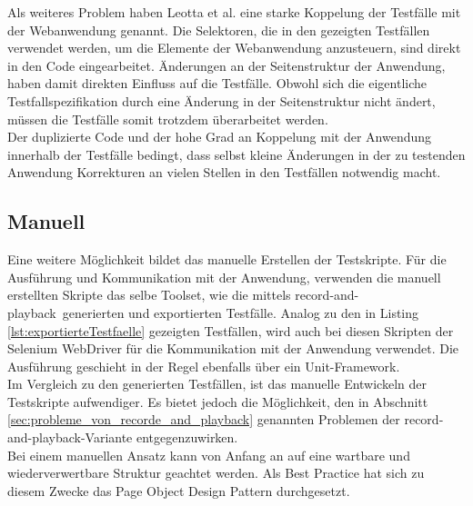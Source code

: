 Als weiteres Problem haben Leotta et al. \cite{leotta_repairing_2013} eine starke Koppelung der Testfälle mit der Webanwendung genannt. Die Selektoren, die in den gezeigten Testfällen verwendet werden, um die Elemente der Webanwendung anzusteuern, sind direkt in den Code eingearbeitet. Änderungen an der Seitenstruktur der Anwendung, haben damit direkten Einfluss auf die Testfälle.
Obwohl sich die eigentliche Testfallspezifikation durch eine Änderung in der Seitenstruktur nicht ändert, müssen die Testfälle somit trotzdem überarbeitet werden.\\
Der duplizierte Code und der hohe Grad an Koppelung mit der Anwendung innerhalb der Testfälle bedingt, dass selbst kleine Änderungen in der zu testenden Anwendung Korrekturen an vielen Stellen in den Testfällen notwendig macht.

\subsection{Manuell}
\label{sec:manuell}
Eine weitere Möglichkeit bildet das manuelle Erstellen der Testskripte. Für die Ausführung und Kommunikation mit der Anwendung, verwenden die manuell erstellten Skripte das selbe Toolset, wie die mittels \grq record-and-playback\grq\ generierten und exportierten Testfälle. Analog zu den in Listing \ref{lst:exportierteTestfaelle} gezeigten Testfällen, wird auch bei diesen Skripten der Selenium WebDriver für die Kommunikation mit der Anwendung verwendet. Die Ausführung geschieht in der Regel ebenfalls über ein Unit-Framework.\\
Im Vergleich zu den generierten Testfällen, ist das manuelle Entwickeln der Testskripte aufwendiger.
Es bietet jedoch die Möglichkeit, den in Abschnitt \ref{sec:probleme_von_recorde_and_playback} genannten Problemen der \grq record-and-playback\grq -Variante entgegenzuwirken.\\
Bei einem manuellen Ansatz kann von Anfang an auf eine wartbare und wiederverwertbare Struktur geachtet werden.
Als Best Practice hat sich zu diesem Zwecke das Page Object Design Pattern durchgesetzt.


